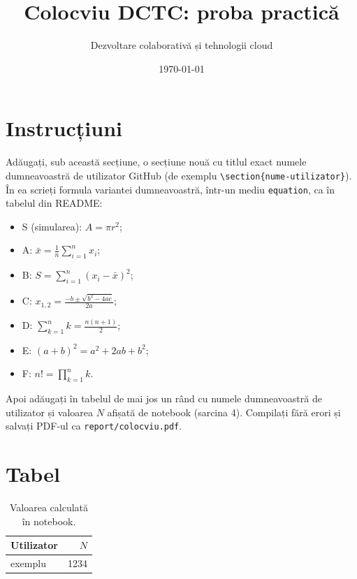 \documentclass[a4paper,11pt]{article}
\title{Colocviu DCTC: proba practică}
\author{Dezvoltare colaborativă și tehnologii cloud}
\date{\today}
\begin{document}
\maketitle

\section{Instrucțiuni}

Adăugați, sub această secțiune, o secțiune nouă cu titlul exact numele dumneavoastră de utilizator GitHub
(de exemplu \verb|\section{nume-utilizator}|). În ea scrieți formula variantei dumneavoastră, într-un mediu
\texttt{equation}, ca în tabelul din README:

\begin{itemize}
  \item S (simularea): $A = \pi r^2$;
  \item A: $\bar{x} = \frac{1}{n}\sum_{i=1}^{n} x_i$;
  \item B: $S = \sum_{i=1}^{n} (x_i - \bar{x})^2$;
  \item C: $x_{1,2} = \frac{-b \pm \sqrt{b^2 - 4ac}}{2a}$;
  \item D: $\sum_{k=1}^{n} k = \frac{n(n+1)}{2}$;
  \item E: $(a+b)^2 = a^2 + 2ab + b^2$;
  \item F: $n! = \prod_{k=1}^{n} k$.
\end{itemize}

Apoi adăugați în tabelul de mai jos un rând cu numele dumneavoastră de utilizator și valoarea $N$ afișată
de notebook (sarcina 4). Compilați fără erori și salvați PDF-ul ca \texttt{report/colocviu.pdf}.


\section{Tabel}

\begin{table}[h]
  \centering
  \begin{tabular}{lr}
    \toprule
    Utilizator & $N$ \\
    \midrule
    exemplu & 1234 \\
    \bottomrule
  \end{tabular}
  \caption{Valoarea calculată în notebook.}
\end{table}
\end{document}
